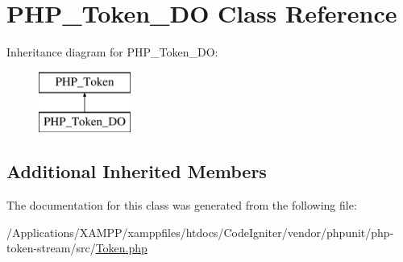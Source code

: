 \hypertarget{class_p_h_p___token___d_o}{}\section{P\+H\+P\+\_\+\+Token\+\_\+\+DO Class Reference}
\label{class_p_h_p___token___d_o}
Inheritance diagram for P\+H\+P\+\_\+\+Token\+\_\+\+DO\+:\begin{figure}[H]
\begin{center}
\leavevmode
\includegraphics[height=2.000000cm]{class_p_h_p___token___d_o}
\end{center}
\end{figure}
\subsection*{Additional Inherited Members}


The documentation for this class was generated from the following file\+:\begin{DoxyCompactItemize}
\item 
/\+Applications/\+X\+A\+M\+P\+P/xamppfiles/htdocs/\+Code\+Igniter/vendor/phpunit/php-\/token-\/stream/src/\mbox{\hyperlink{_token_8php}{Token.\+php}}\end{DoxyCompactItemize}
